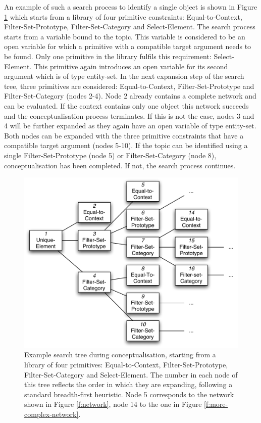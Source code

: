 An example of such a search process to identify a single object is
shown in Figure \ref{f:conceptualisation} which starts from a library
of four primitive constraints: {\sc Equal-to-Context}, {\sc
  Filter-Set-Prototype}, {\sc Filter-Set-Category} and {\sc
  Select-Element}. The search process starts from a variable bound to
the topic. This variable is considered to be an open variable for
which a primitive with a compatible target argument needs to be
found. Only one primitive in the library fulfils this requirement:
{\sc Select-Element}. This primitive again introduces an open variable
for its second argument which is of type entity-set. In the next
expansion step of the search tree, three primitives are considered:
{\sc Equal-to-Context}, {\sc Filter-Set-Prototype} and {\sc
  Filter-Set-Category} (nodes 2-4). Node 2 already contains a complete
network and can be evaluated. If the context contains only one object
this network succeeds and the conceptualisation process terminates. If
this is not the case, nodes 3 and 4 will be further expanded as they
again have an open variable of type entity-set. Both nodes can be
expanded with the three primitive constraints that have a compatible
target argument (nodes 5-10). If the topic can be identified using a
single {\sc Filter-Set-Prototype} (node 5) or {\sc
  Filter-Set-Category} (node 8), conceptualisation has been
completed. If not, the search process continues.

\begin{figure}[htbp]
  \begin{center}
    \includegraphics[width=\textwidth]{./frameworks/figures/conceptualisation.pdf}
    \caption[Example of the conceptualisation process]{Example search
      tree during conceptualisation, starting from a library of four
      primitives: {\sc Equal-to-Context}, {\sc Filter-Set-Prototype},
      {\sc Filter-Set-Category} and {\sc Select-Element}. The number
      in each node of this tree reflects the order in which they are
      expanding, following a standard breadth-first heuristic. Node 5
      corresponds to the network shown in Figure \ref{f:network}, node
      14 to the one in Figure \ref{f:more-complex-network}.}
    \label{f:conceptualisation}
  \end{center}
\end{figure}

